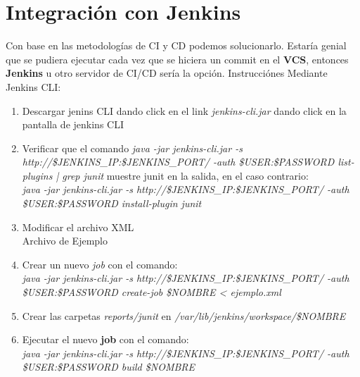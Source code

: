 \documentclass{article}
\begin{document}
\section{Integración con Jenkins}
 Con base en las metodologías de CI y CD podemos solucionarlo. Estaría genial que se pudiera ejecutar cada vez que se hiciera un commit en el \textbf{VCS}, entonces \textbf{Jenkins} u otro servidor de CI/CD sería la opción.
 Instrucciónes Mediante Jenkins CLI:\\
 \begin{enumerate}
     \item Descargar jenins CLI dando click en el link \textit{jenkins-cli.jar} dando click en la pantalla de jenkins CLI
     \item Verificar que el comando \textit{java -jar jenkins-cli.jar -s http://\$JENKINS\_IP:\$JENKINS\_PORT/ -auth \$USER:\$PASSWORD list-plugins | grep junit} muestre junit en la salida, en el caso contrario:\\
     \textit{java -jar jenkins-cli.jar -s http://\$JENKINS\_IP:\$JENKINS\_PORT/ -auth \$USER:\$PASSWORD install-plugin junit}
     \item Modificar el archivo XML\\
     Archivo de Ejemplo
     
     \item Crear un nuevo \textit{job} con el comando:\\
     \textit{java -jar jenkins-cli.jar -s http://\$JENKINS\_IP:\$JENKINS\_PORT/ -auth \$USER:\$PASSWORD create-job \$NOMBRE < ejemplo.xml}
     \item Crear las carpetas \textit{reports/junit} en \textit{/var/lib/jenkins/workspace/\$NOMBRE}
     \item Ejecutar el nuevo \textbf{job} con el comando:\\
     \textit{java -jar jenkins-cli.jar -s http://\$JENKINS\_IP:\$JENKINS\_PORT/ -auth \$USER:\$PASSWORD build \$NOMBRE}
     
 \end{enumerate}
\end{document}

